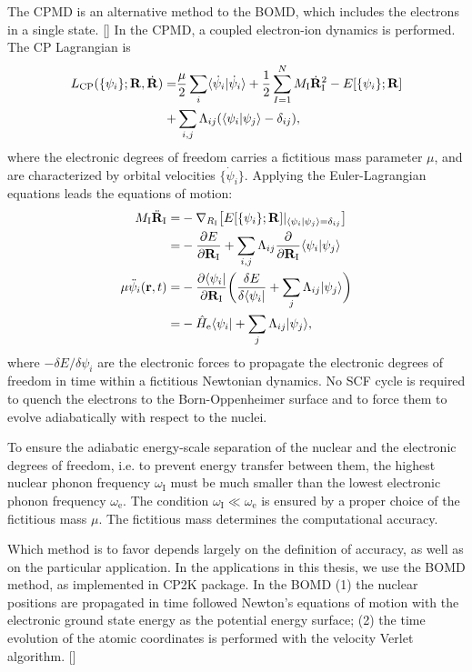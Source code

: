The CPMD is an alternative method to the BOMD, which includes the 
electrons in a single state. [\cite{CP}] In the CPMD, a coupled electron-ion dynamics is performed.
The CP Lagrangian is 
\begin{align}
L_{\text{CP}} (\{\psi_i\}; {\bf R},\dot{{\bf R}}) =& \frac{\mu}{2}\sum_i\langle\dot{\psi}_i|\dot{\psi}_i\rangle +  \frac{1}{2}\sum^N_{I=1}M_{\text{I}}\dot{\bf R}^2_{\text{I}}  - E[\{\psi_i\};{\bf R}] \nonumber \\
   +& \sum_{i,j}\Lambda_{ij}(\langle\psi_i|\psi_j\rangle -\delta_{ij} ),
\label{eq:L_CP}
\end{align}
where the electronic degrees of freedom carries a fictitious mass parameter $\mu$, and are characterized by orbital velocities 
$\{\dot{\psi}_i\}$.  Applying the Euler-Lagrangian equations leads the equations of motion:
\begin{align}
  M_{\text{I}}\ddot{\bf R}_{\text{I}} =& -\nabla_{R_{\text{I}}} \bigl[E[\{\psi_i\};{\bf R}]|_{\langle\psi_i|\psi_j\rangle=\delta_{ij} }\bigr]\nonumber \\
  =&-\frac{\partial E}{\partial {\bf R}_{\text{I}}}  + \sum_{i,j}\Lambda_{ij}\frac{\partial}{\partial {\bf R}_{\text{I}}}\langle\psi_i|\psi_j \rangle\\ 
  \mu\ddot{\psi}_i({\bf r},t) =& -\frac{\partial \langle\psi_i|}{\partial {\bf R}_{\text{I}}}\biggl(\frac{\delta E}{\delta\langle\psi_i|} + \sum_j \Lambda_{ij}|\psi_j\rangle\biggr)\nonumber \\
  =& -\hat{H}_{\text{e}}\langle\psi_i| + \sum_j \Lambda_{ij}|\psi_j\rangle,
\label{eq:LEE_CP}
\end{align}
where $-\delta E/\delta\psi_i$ are the electronic forces to propagate the electronic degrees of freedom in time 
within a fictitious Newtonian dynamics.  No SCF cycle is required to quench the electrons to the Born-Oppenheimer surface and 
to force them to evolve adiabatically with respect to the nuclei.

To ensure the adiabatic energy-scale separation of the nuclear and the electronic degrees of freedom, i.e. 
to prevent energy transfer between them, the highest nuclear phonon frequency  $\omega_{\text{I}}$ must be 
much smaller than the lowest electronic phonon frequency $\omega_{\text{e}}$. The condition $\omega_{\text{I}} \ll \omega_{\text{e}}$ 
is ensured by a proper choice of the fictitious mass $\mu$. The fictitious mass determines the computational accuracy.  

Which method is to favor depends largely on the definition of accuracy, as well as on the particular application.
In the applications in this thesis, we use the BOMD method, as implemented in CP2K package. \cite{CP2K} 
In the BOMD  
(1) the nuclear positions are propagated in time followed Newton's equations of motion with the electronic ground state energy as the potential energy surface; 
(2) the time evolution of the atomic coordinates is performed with the velocity Verlet algorithm. [\cite{FS2002}]

